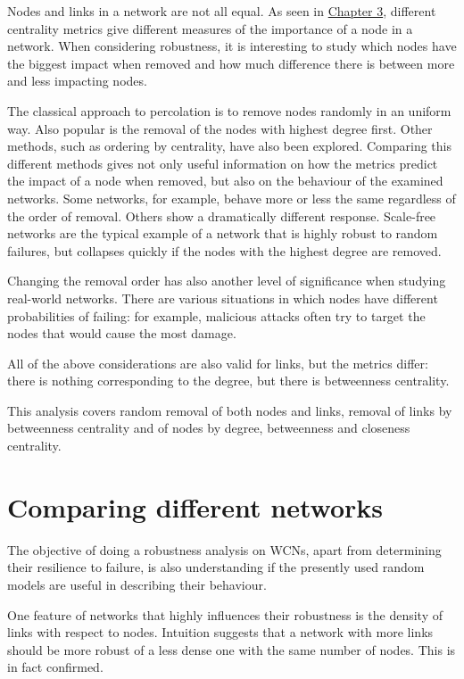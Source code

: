 \documentclass[oneside,openany]{memoir}
\begin{document}
Nodes and links in a network are not all equal. As seen in
\hyperref[network-topology-and-graphs]{Chapter 3}, different
centrality metrics give different measures of the importance of a node
in a network. When considering robustness, it is interesting to study
which nodes have the biggest impact when removed and how much difference
there is between more and less impacting nodes.

The classical approach to percolation is to remove nodes randomly in an
uniform way. Also popular is the removal of the nodes with highest
degree first. Other methods, such as ordering by centrality, have also
been explored. Comparing this different methods gives not only useful
information on how the metrics predict the impact of a node when
removed, but also on the behaviour of the examined networks. Some
networks, for example, behave more or less the same regardless of the
order of removal. Others show a dramatically different response.
Scale-free networks are the typical example of a network that is highly
robust to random failures, but collapses quickly if the nodes with the
highest degree are removed.

Changing the removal order has also another level of significance when
studying real-world networks. There are various situations in which
nodes have different probabilities of failing: for example, malicious
attacks often try to target the nodes that would cause the most damage.

All of the above considerations are also valid for links, but the
metrics differ: there is nothing corresponding to the degree, but there
is betweenness centrality.

This analysis covers random removal of both nodes and links, removal of
links by betweenness centrality and of nodes by degree, betweenness and
closeness centrality.

\section{Comparing different networks}\label{comparing-different-networks}

The objective of doing a robustness analysis on WCNs, apart from
determining their resilience to failure, is also understanding if the
presently used random models are useful in describing their behaviour.

One feature of networks that highly influences their robustness is the
density of links with respect to nodes. Intuition suggests that a
network with more links should be more robust of a less dense one with
the same number of nodes. This is in fact confirmed.
\end{document}
